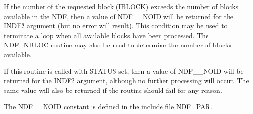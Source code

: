 \documentclass[twoside,11pt]{article}
\newcommand{\htmlref}[2]{#1}
\newcommand{\sstitem}{\item}
\newcommand{\sstitem}{\item}
\begin{document}
{{{         \sstitem
         If the number of the requested block (IBLOCK) exceeds the
         number of blocks available in the NDF, then a value of NDF\_\_NOID
         will be returned for the INDF2 argument (but no error will
         result). This condition may be used to terminate a loop when all
         available blocks have been processed. The \htmlref{NDF\_NBLOC}{NDF_NBLOC} routine may
         also be used to determine the number of blocks available.

         \sstitem
         If this routine is called with STATUS set, then a value of
         NDF\_\_NOID will be returned for the INDF2 argument, although no
         further processing will occur. The same value will also be
         returned if the routine should fail for any reason.

         \sstitem
         The NDF\_\_NOID constant is defined in the include file NDF\_PAR.
      }
   }
}
\end{document}
